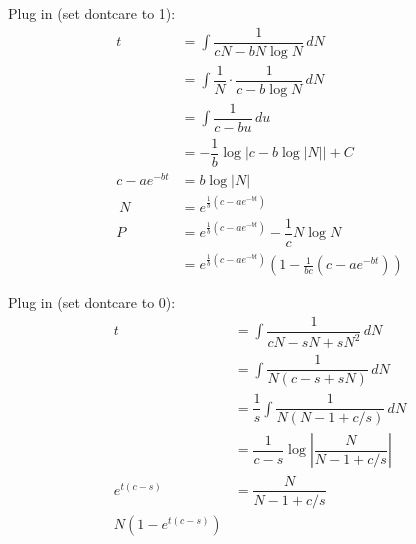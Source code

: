 \documentclass[11pt]{article}
\begin{document}
    \begin{solution}
        Plug in (set dontcare to 1):
        \begin{align}
            t &= \int \dfrac{1}{cN - b N\log N} \, dN  \\
            &= \int \dfrac{1}{N} \cdot \dfrac{1}{c-b \log N} \, dN \\
            &= \int \dfrac{1}{c-bu} \, du \\
            &= -\dfrac{1}{b}\log | c-b\log|N||+C \\
            c-ae^{-bt} &= b \log|N| \\\
            N &= e^{\frac{1}{b}(c-ae^{-bt})} \\
            P &= e^{\frac{1}{b}(c-ae^{-bt})} - \dfrac{1}{c} N\log N \\
            &= e^{\frac{1}{b}(c-ae^{-bt})}\left(1-\frac{1}{bc}(c-ae^{-bt})\right)
        \end{align}
    \end{solution}
    \begin{solution}
        Plug in (set dontcare to 0):
        \begin{align}
            t &= \int \dfrac{1}{cN - sN + sN^2} \, dN \\
            &= \int \dfrac{1}{N(c-s+sN)} \, dN \\
            &= \dfrac{1}{s} \int \dfrac{1}{N(N-1+c/s)} \, dN \\
            &= \dfrac{1}{c-s}\log \left|\dfrac{N}{N-1+c/s} \right| \\
            e^{t(c-s)} &= \dfrac{N}{N-1+c/s} \\
            N(1-e^{t(c-s)}) 
        \end{align}
    \end{solution}
\end{document}

